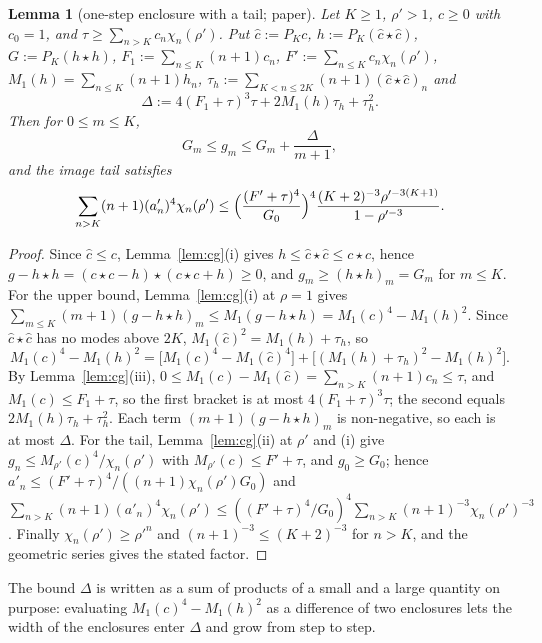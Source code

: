 \documentclass[11pt,a4paper]{article}
\newtheorem{lemma}[theorem]{Lemma}
\theoremstyle{definition}
\theoremstyle{remark}
\begin{document}
\begin{lemma}[one-step enclosure with a tail; paper]\label{lem:step}
Let $K\ge1$, $\rho'>1$, $c\ge0$ with $c_0=1$, and $\tau\ge\sum_{n>K}c_n\chi_n(\rho')$.
Put $\hat c:=P_Kc$, $h:=P_K(\hat c\star\hat c)$, $G:=P_K(h\star h)$, $F_1:=\sum_{n\le K}(n+1)c_n$, $F':=\sum_{n\le K}c_n\chi_n(\rho')$, $M_1(h)=\sum_{n\le K}(n+1)h_n$, $\tau_h:=\sum_{K<n\le2K}(n+1)(\hat c\star\hat c)_n$ and
\[
\Delta:=4(F_1+\tau)^3\tau+2M_1(h)\tau_h+\tau_h^2 .
\]
Then for $0\le m\le K$,
\[
G_m\le g_m\le G_m+\frac{\Delta}{m+1},
\]
and the image tail satisfies
\[
\sum_{n>K}(n+1)(a'_n)^4\chi_n(\rho')\le\Bigl(\frac{(F'+\tau)^4}{G_0}\Bigr)^4\frac{(K+2)^{-3}\rho'^{-3(K+1)}}{1-\rho'^{-3}} .
\]
\end{lemma}
\begin{proof}
Since $\hat c\le c$, Lemma~\ref{lem:cg}(i) gives $h\le\hat c\star\hat c\le c\star c$, hence $g-h\star h=(c\star c-h)\star(c\star c+h)\ge0$, and $g_m\ge(h\star h)_m=G_m$ for $m\le K$.
For the upper bound, Lemma~\ref{lem:cg}(i) at $\rho=1$ gives $\sum_{m\le K}(m+1)(g-h\star h)_m\le M_1(g-h\star h)=M_1(c)^4-M_1(h)^2$.
Since $\hat c\star\hat c$ has no modes above $2K$, $M_1(\hat c)^2=M_1(h)+\tau_h$, so
\[
M_1(c)^4-M_1(h)^2=\bigl[M_1(c)^4-M_1(\hat c)^4\bigr]+\bigl[(M_1(h)+\tau_h)^2-M_1(h)^2\bigr].
\]
By Lemma~\ref{lem:cg}(iii), $0\le M_1(c)-M_1(\hat c)=\sum_{n>K}(n+1)c_n\le\tau$, and $M_1(c)\le F_1+\tau$, so the first bracket is at most $4(F_1+\tau)^3\tau$; the second equals $2M_1(h)\tau_h+\tau_h^2$.
Each term $(m+1)(g-h\star h)_m$ is non-negative, so each is at most $\Delta$.
For the tail, Lemma~\ref{lem:cg}(ii) at $\rho'$ and (i) give $g_n\le M_{\rho'}(c)^4/\chi_n(\rho')$ with $M_{\rho'}(c)\le F'+\tau$, and $g_0\ge G_0$; hence $a'_n\le(F'+\tau)^4/((n+1)\chi_n(\rho')G_0)$ and
$\sum_{n>K}(n+1)(a'_n)^4\chi_n(\rho')\le((F'+\tau)^4/G_0)^4\sum_{n>K}(n+1)^{-3}\chi_n(\rho')^{-3}$.
Finally $\chi_n(\rho')\ge\rho'^n$ and $(n+1)^{-3}\le(K+2)^{-3}$ for $n>K$, and the geometric series gives the stated factor.
\end{proof}
The bound $\Delta$ is written as a sum of products of a small and a large quantity on purpose: evaluating $M_1(c)^4-M_1(h)^2$ as a difference of two enclosures lets the width of the enclosures enter $\Delta$ and grow from step to step.
\end{document}
